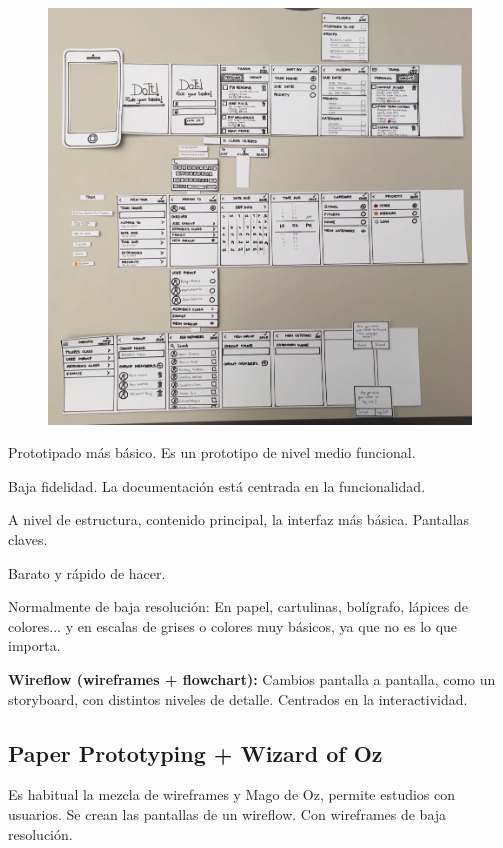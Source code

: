 \documentclass[12pt, twoside, openright]{report} %
\begin{document}
\begin{figure}[H]
	{\includegraphics[scale=.4]{2021-03-20 23_51_33-L5.pdf - Foxit Reader.png}}
\end{figure}

Prototipado más básico. Es un prototipo de nivel medio funcional.

Baja fidelidad. La documentación está centrada en la funcionalidad.

A nivel de estructura, contenido principal, la interfaz más básica.
Pantallas claves.

Barato y rápido de hacer.

Normalmente de baja resolución: En papel, cartulinas, bolígrafo, lápices de colores... y en escalas de grises o colores muy básicos, ya que no es lo que importa.

\textbf{Wireflow (wireframes + flowchart):} Cambios pantalla a pantalla, como un storyboard, con distintos niveles de detalle. Centrados en la interactividad.

\subsection{Paper Prototyping + Wizard of Oz}

Es habitual la mezcla de wireframes y Mago de Oz, permite estudios con usuarios.
Se crean las pantallas de un wireflow. Con wireframes de baja resolución.
\end{document}
